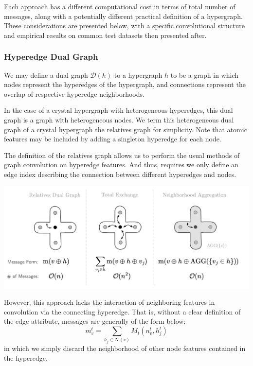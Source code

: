 \documentclass[10pt,a4paper]{article}
\begin{document}
Each approach has a different computational cost in terms of total number of messages, along with a potentially different practical definition of a hypergraph. These considerations are presented below, with a specific convolutional structure and empirical results on common test datasets then presented after.


\subsubsection{Hyperedge Dual Graph}
We may define a dual graph $\mathcal{D}(h)$ to a hypergraph $h$ to be a graph in which nodes represent the hyperedges of the hypergraph, and connections represent the overlap of respective hyperedge neighborhoods. 

In the case of a crystal hypergraph with heterogeneous hyperedges, this dual graph is a graph with heterogeneous nodes. We term this heterogeneous dual graph of a crystal hypergraph the relatives graph for simplicity. 
Note that atomic features may be included by adding a singleton hyperedge for each node.

The definition of the relatives graph allows us to perform the usual methods of graph convolution on hyperedge features. And thus, requires we only define an edge index describing the connection between different hyperedges and nodes.

\begin{center}
\includegraphics[scale=.75]{HMPNN.pdf}
\end{center}
However, this approach lacks the interaction of neighboring features in convolution via the connecting hyperedge. That is, without a clear definition of the edge attribute, messages are generally of the form below:
$$
m_v^{t} = \sum_{h_j\in \mathcal{N}(v)}M_t(n_v^{t},h_j^{t})
$$
in which we simply discard the neighborhood of other node features contained in the hyperedge.
\end{document}
